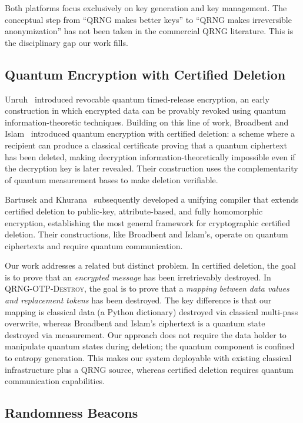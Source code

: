 \documentclass[journal]{IEEEtran}
\begin{document}
Both platforms focus exclusively on key generation and key management. The conceptual step from ``QRNG makes better keys'' to ``QRNG makes irreversible anonymization'' has not been taken in the commercial QRNG literature. This is the disciplinary gap our work fills.

\subsection{Quantum Encryption with Certified Deletion}

Unruh~\cite{unruh2015revocable} introduced revocable quantum timed-release encryption, an early construction in which encrypted data can be provably revoked using quantum information-theoretic techniques. Building on this line of work, Broadbent and Islam~\cite{broadbent2020certified} introduced quantum encryption with certified deletion: a scheme where a recipient can produce a classical certificate proving that a quantum ciphertext has been deleted, making decryption information-theoretically impossible even if the decryption key is later revealed. Their construction uses the complementarity of quantum measurement bases to make deletion verifiable.

Bartusek and Khurana~\cite{bartusek2023certified} subsequently developed a unifying compiler that extends certified deletion to public-key, attribute-based, and fully homomorphic encryption, establishing the most general framework for cryptographic certified deletion. Their constructions, like Broadbent and Islam's, operate on quantum ciphertexts and require quantum communication.

Our work addresses a related but distinct problem. In certified deletion, the goal is to prove that an \emph{encrypted message} has been irretrievably destroyed. In \textsc{QRNG-OTP-Destroy}, the goal is to prove that a \emph{mapping between data values and replacement tokens} has been destroyed. The key difference is that our mapping is classical data (a Python dictionary) destroyed via classical multi-pass overwrite, whereas Broadbent and Islam's ciphertext is a quantum state destroyed via measurement. Our approach does not require the data holder to manipulate quantum states during deletion; the quantum component is confined to entropy generation. This makes our system deployable with existing classical infrastructure plus a QRNG source, whereas certified deletion requires quantum communication capabilities.

\subsection{Randomness Beacons}
\end{document}
